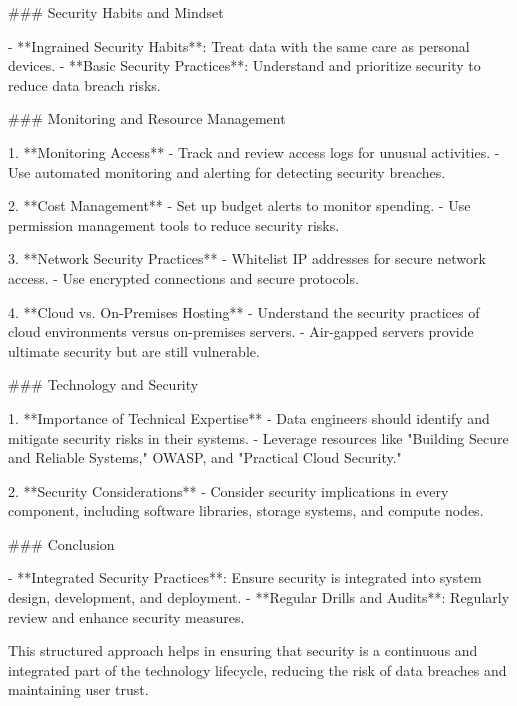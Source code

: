 ### Security Habits and Mindset

- **Ingrained Security Habits**: Treat data with the same care as personal devices.
- **Basic Security Practices**: Understand and prioritize security to reduce data breach risks.

### Monitoring and Resource Management

1. **Monitoring Access**
   - Track and review access logs for unusual activities.
   - Use automated monitoring and alerting for detecting security breaches.

2. **Cost Management**
   - Set up budget alerts to monitor spending.
   - Use permission management tools to reduce security risks.

3. **Network Security Practices**
   - Whitelist IP addresses for secure network access.
   - Use encrypted connections and secure protocols.

4. **Cloud vs. On-Premises Hosting**
   - Understand the security practices of cloud environments versus on-premises servers.
   - Air-gapped servers provide ultimate security but are still vulnerable.

### Technology and Security

1. **Importance of Technical Expertise**
   - Data engineers should identify and mitigate security risks in their systems.
   - Leverage resources like "Building Secure and Reliable Systems," OWASP, and "Practical Cloud Security."

2. **Security Considerations**
   - Consider security implications in every component, including software libraries, storage systems, and compute nodes.

### Conclusion

- **Integrated Security Practices**: Ensure security is integrated into system design, development, and deployment.
- **Regular Drills and Audits**: Regularly review and enhance security measures.

This structured approach helps in ensuring that security is a continuous and integrated part of the technology lifecycle, reducing the risk of data breaches and maintaining user trust.